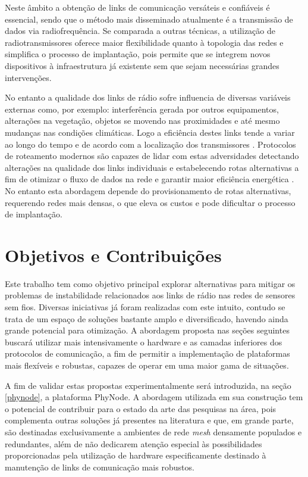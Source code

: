 \documentclass[
	12pt,				%
	openright,			%
	oneside,
	a4paper,			%
	english,			%
	french,				%
	spanish,			%
	brazil				%
	]{abntex2}
\begin{document}
Neste âmbito a obtenção de links de comunicação versáteis e confiáveis é essencial, sendo que o método mais disseminado atualmente é a transmissão de dados via radiofrequência. Se comparada a outras técnicas, a utilização de radiotransmissores oferece maior flexibilidade quanto à topologia das redes e simplifica o processo de implantação, pois permite que se integrem novos dispositivos à infraestrutura já existente sem que sejam necessárias grandes intervenções.

No entanto a qualidade dos links de rádio sofre influencia de diversas variáveis externas como, por exemplo: interferência gerada por outros equipamentos, alterações na vegetação, objetos se movendo nas proximidades e até mesmo mudanças nas condições climáticas. Logo a eficiência destes links tende a variar ao longo do tempo e de acordo com a localização dos transmissores \cite{Kusy2011}. Protocolos de roteamento modernos são capazes de lidar com estas adversidades detectando alterações na qualidade dos links individuais e estabelecendo rotas alternativas a fim de otimizar o fluxo de dados na rede e garantir maior eficiência energética \cite{Gnawali2009}. No entanto esta abordagem depende do provisionamento de rotas alternativas, requerendo redes mais densas, o que eleva os custos e pode dificultar o processo de implantação.

\section{Objetivos e Contribuições}
Este trabalho tem como objetivo principal explorar alternativas para mitigar os problemas de instabilidade relacionados aos links de rádio nas redes de sensores sem fios. Diversas iniciativas já foram realizadas com este intuito, contudo se trata de um espaço de soluções bastante amplo e diversificado, havendo ainda grande potencial para otimização. A abordagem proposta nas seções seguintes buscará utilizar mais intensivamente o hardware e as camadas inferiores dos protocolos de comunicação, a fim de permitir a implementação de plataformas mais flexíveis e robustas, capazes de operar em uma maior gama de situações. 

A fim de validar estas propostas experimentalmente será introduzida, na seção \ref{phynode}, a plataforma PhyNode. A abordagem utilizada em sua construção tem o potencial de contribuir para o estado da arte das pesquisas na área, pois complementa outras soluções já presentes na literatura \cite{Pantazis2013, Tarique2009} e que, em grande parte, são destinadas exclusivamente a ambientes de rede \textit{mesh} densamente populados e redundantes, além de não dedicarem atenção especial às possibilidades proporcionadas pela utilização de hardware especificamente destinado à manutenção de links de comunicação mais robustos.
\end{document}
